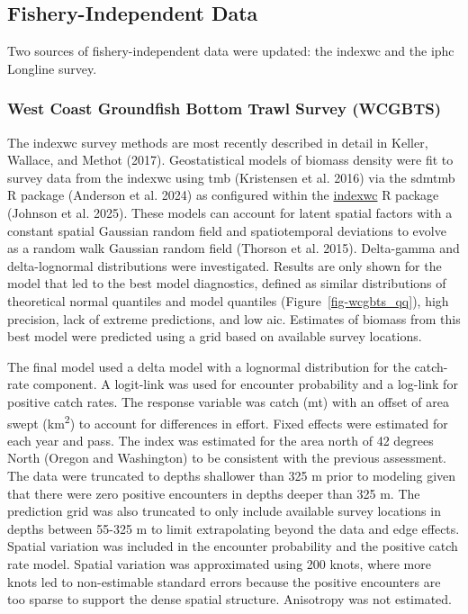\documentclass[
  english,
]{article}
\begin{document}
\subsection{Fishery-Independent Data}\label{fishery-independent-data}

Two sources of fishery-independent data were updated: the \gls{indexwc}
and the \gls{iphc} Longline survey.

\subsubsection{West Coast Groundfish Bottom Trawl Survey
(WCGBTS)}\label{west-coast-groundfish-bottom-trawl-survey-wcgbts}

The \gls{indexwc} survey methods are most recently described in detail
in Keller, Wallace, and Methot (2017). Geostatistical models of biomass
density were fit to survey data from the \gls{indexwc} using \gls{tmb}
(Kristensen et al. 2016) via the \gls{sdmtmb} R package (Anderson et al.
2024) as configured within the
\href{https://github.com/pfmc-assessments/indexwc}{indexwc} R package
(Johnson et al. 2025). These models can account for latent spatial
factors with a constant spatial Gaussian random field and spatiotemporal
deviations to evolve as a random walk Gaussian random field (Thorson et
al. 2015). Delta-gamma and delta-lognormal distributions were
investigated. Results are only shown for the model that led to the best
model diagnostics, defined as similar distributions of theoretical
normal quantiles and model quantiles (Figure~\ref{fig-wcgbts_qq}), high
precision, lack of extreme predictions, and low \gls{aic}. Estimates of
biomass from this best model were predicted using a grid based on
available survey locations.

The final model used a delta model with a lognormal distribution for the
catch-rate component. A logit-link was used for encounter probability
and a log-link for positive catch rates. The response variable was catch
(mt) with an offset of area swept (km\textsuperscript{2}) to account for
differences in effort. Fixed effects were estimated for each year and
pass. The index was estimated for the area north of 42 degrees North
(Oregon and Washington) to be consistent with the previous assessment.
The data were truncated to depths shallower than 325 m prior to modeling
given that there were zero positive encounters in depths deeper than 325
m. The prediction grid was also truncated to only include available
survey locations in depths between 55-325 m to limit extrapolating
beyond the data and edge effects. Spatial variation was included in the
encounter probability and the positive catch rate model. Spatial
variation was approximated using 200 knots, where more knots led to
non-estimable standard errors because the positive encounters are too
sparse to support the dense spatial structure. Anisotropy was not
estimated.
\end{document}

